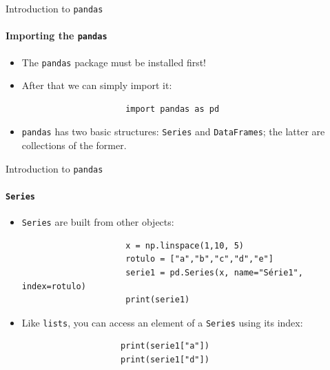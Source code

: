 \documentclass[notes,11pt, aspectratio=169, xcolor=table]{beamer}
\begin{document}
        \begin{frame}[fragile=singleslide]{Introduction to \texttt{pandas}}
        \framesubtitle{Importing the \texttt{pandas}}
            
             \begin{itemize}
    
                \item The \texttt{pandas} package must be installed first!
                
                \item After that we can simply import it:
    
                    \begin{verbatim}
                     import pandas as pd
                    \end{verbatim}
                    
                \item \texttt{pandas} has two basic structures: \texttt{Series} and \texttt{DataFrames}; the latter are collections of the former.
                    
            \end{itemize}             
    
        \end{frame}
        
        \begin{frame}[fragile=singleslide]{Introduction to \texttt{pandas}}
        \framesubtitle{\texttt{Series}}
            
             \begin{itemize}
    
                \item \texttt{Series} are built from other objects:
    
                    \begin{verbatim}
                     x = np.linspace(1,10, 5)
                     rotulo = ["a","b","c","d","e"]
                     serie1 = pd.Series(x, name="Série1", index=rotulo)
                     print(serie1)
                    \end{verbatim}
                    
                \item Like \texttt{lists}, you can access an element of a \texttt{Series} using its index:
                
                \begin{verbatim}
                    print(serie1["a"])
                    print(serie1["d"])
                \end{verbatim}
                
                    
            \end{itemize}             
    
        \end{frame}    
\end{document}
